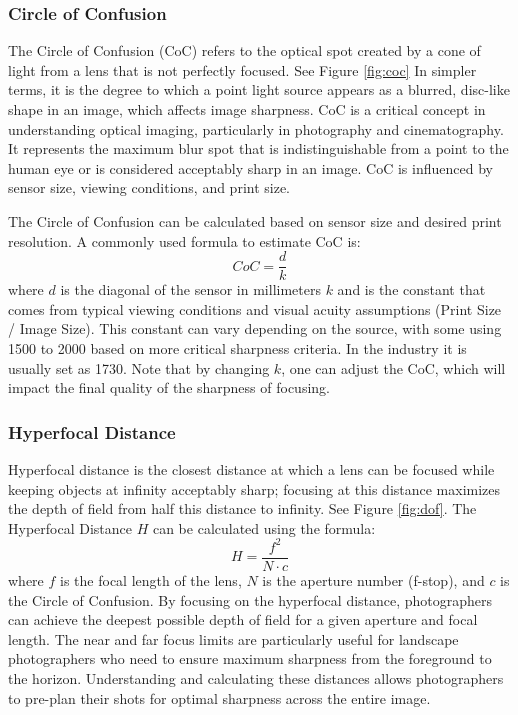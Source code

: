 \documentclass{article}
\begin{document}
\subsubsection{Circle of Confusion}
\label{sec:coc}

The Circle of Confusion (CoC) refers to the optical spot created by a cone of light from a lens that is not perfectly focused. See Figure \ref{fig:coc} In simpler terms, it is the degree to which a point light source appears as a blurred, disc-like shape in an image, which affects image sharpness. CoC is a critical concept in understanding optical imaging, particularly in photography and cinematography. It represents the maximum blur spot that is indistinguishable from a point to the human eye or is considered acceptably sharp in an image. CoC is influenced by sensor size, viewing conditions, and print size.

The Circle of Confusion can be calculated based on sensor size and desired print resolution. A commonly used formula to estimate CoC is:
\[
CoC = \frac{d}{k}
\]
where \( d \) is the diagonal of the sensor in millimeters \(k\) and is the constant that comes from typical viewing conditions and visual acuity assumptions (Print Size / Image Size).
This constant can vary depending on the source, with some using 1500 to 2000 based on more critical sharpness criteria. In the industry it is usually set as 1730.  Note that by changing \(k\), one can adjust the CoC, which will impact the final quality of the sharpness of focusing.


\subsubsection{Hyperfocal Distance}
\label{ssec:hyperfocal}


Hyperfocal distance is the closest distance at which a lens can be focused while keeping objects at infinity acceptably sharp; focusing at this distance maximizes the depth of field from half this distance to infinity. See Figure \ref{fig:dof}. 
The Hyperfocal Distance \( H \) can be calculated using the formula:
\[
H = \frac{f^2}{N \cdot c}
\]
where \( f \) is the focal length of the lens, \( N \) is the aperture number (f-stop), and \( c \) is the Circle of Confusion.
By focusing on the hyperfocal distance, photographers can achieve the deepest possible depth of field for a given aperture and focal length. The near and far focus limits are particularly useful for landscape photographers who need to ensure maximum sharpness from the foreground to the horizon. Understanding and calculating these distances allows photographers to pre-plan their shots for optimal sharpness across the entire image.
\end{document}
